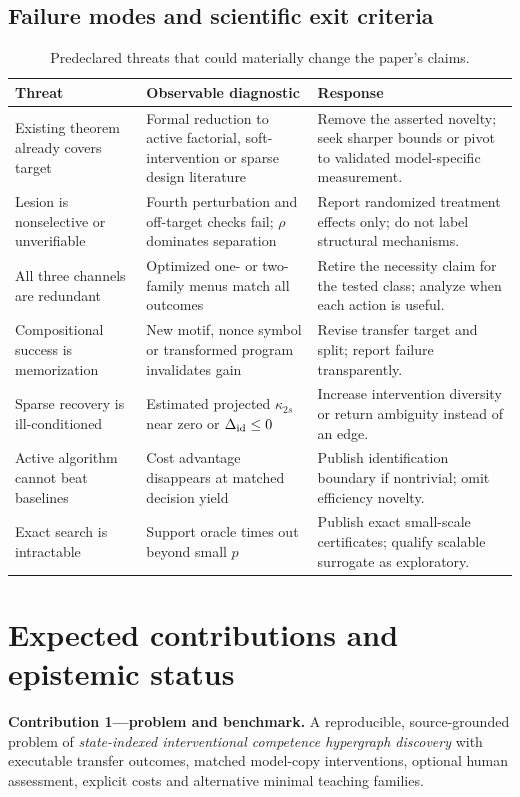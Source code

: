 \documentclass[11pt,a4paper]{article}
\theoremstyle{definition}\newtheorem{definition}[theorem]{Definition}
\theoremstyle{remark}\newtheorem{remark}[theorem]{Remark}
\begin{document}
\subsection{Failure modes and scientific exit criteria}
\begin{table}[htbp]\centering\footnotesize
\caption{Predeclared threats that could materially change the paper's claims.}\label{tab:risks}
\begin{tabularx}{\linewidth}{@{}p{.22\linewidth}Y Y@{}}\toprule
Threat&Observable diagnostic&Response\\\midrule
Existing theorem already covers target&Formal reduction to active factorial, soft-intervention or sparse design literature&Remove the asserted novelty; seek sharper bounds or pivot to validated model-specific measurement.\\
Lesion is nonselective or unverifiable&Fourth perturbation and off-target checks fail; $\rho$ dominates separation&Report randomized treatment effects only; do not label structural mechanisms.\\
All three channels are redundant&Optimized one- or two-family menus match all outcomes&Retire the necessity claim for the tested class; analyze when each action is useful.\\
Compositional success is memorization&New motif, nonce symbol or transformed program invalidates gain&Revise transfer target and split; report failure transparently.\\
Sparse recovery is ill-conditioned&Estimated projected $\kappa_{2s}$ near zero or $\Delta_{\rm id}\le0$&Increase intervention diversity or return ambiguity instead of an edge.\\
Active algorithm cannot beat baselines&Cost advantage disappears at matched decision yield&Publish identification boundary if nontrivial; omit efficiency novelty.\\
Exact search is intractable&Support oracle times out beyond small $p$&Publish exact small-scale certificates; qualify scalable surrogate as exploratory.\\\bottomrule
\end{tabularx}
\end{table}

\section{Expected contributions and epistemic status}\label{sec:claims}
\textbf{Contribution 1---problem and benchmark.} A reproducible, source-grounded problem of \emph{state-indexed interventional competence hypergraph discovery} with executable transfer outcomes, matched model-copy interventions, optional human assessment, explicit costs and alternative minimal teaching families.
\end{document}
